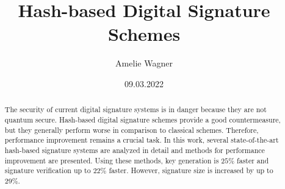 \documentclass[ngerman,BCOR=4mm, english]{tudscrreprt}
\newcommand{\?}{\stackrel{?}{=}} %
\begin{document}
\date{09.03.2022}
\title{%
  Hash-based Digital Signature Schemes
}
\subject{master}
\author{%
  Amelie Wagner%
}
\maketitle %



\begin{otherlanguage}{ngerman} %
\confirmation
\end{otherlanguage}

\begin{abstract}
The security of current digital signature systems is in danger because they are not quantum secure. Hash-based digital signature schemes provide a good  countermeasure, but they generally perform worse in comparison to classical schemes. Therefore, performance improvement remains a crucial task.  
In this work, several state-of-the-art hash-based signature systems are analyzed in detail and methods for performance improvement are presented.
Using these methods, key generation is $25\%$ faster and signature verification up to $22\%$ faster. However, signature size is increased by up to $29\%$.
\end{abstract}

\tableofcontents







\appendix 





\end{document}
